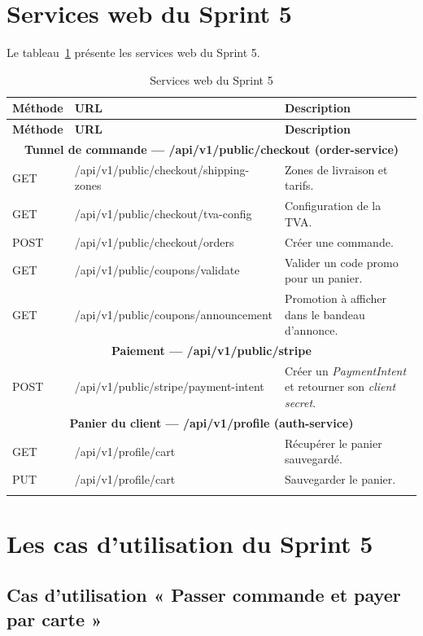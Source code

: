 \section{Services web du Sprint 5}
Le tableau~\ref{tab:ws-sprint5} présente les services web du Sprint 5.
\renewcommand{\arraystretch}{1.15}
\setlength{\tabcolsep}{4pt}
\begin{longtable}{|p{1.5cm}|p{6.8cm}|p{6.2cm}|}
\hline
\textbf{Méthode} & \textbf{URL} & \textbf{Description} \\
\hline
\endfirsthead
\hline
\textbf{Méthode} & \textbf{URL} & \textbf{Description} \\
\hline
\endhead
\multicolumn{3}{|c|}{\textbf{Tunnel de commande --- /api/v1/public/checkout (order-service)}} \\
\hline
GET & /api/v1/public/checkout/shipping-zones & Zones de livraison et tarifs. \\
\hline
GET & /api/v1/public/checkout/tva-config & Configuration de la TVA. \\
\hline
POST & /api/v1/public/checkout/orders & Créer une commande. \\
\hline
GET & /api/v1/public/coupons/validate & Valider un code promo pour un panier. \\
\hline
GET & /api/v1/public/coupons/announcement & Promotion à afficher dans le bandeau d'annonce. \\
\hline
\multicolumn{3}{|c|}{\textbf{Paiement --- /api/v1/public/stripe}} \\
\hline
POST & /api/v1/public/stripe/payment-intent & Créer un \textit{PaymentIntent} et retourner son \textit{client secret}. \\
\hline
\multicolumn{3}{|c|}{\textbf{Panier du client --- /api/v1/profile (auth-service)}} \\
\hline
GET & /api/v1/profile/cart & Récupérer le panier sauvegardé. \\
\hline
PUT & /api/v1/profile/cart & Sauvegarder le panier. \\
\hline
\caption{Services web du Sprint 5}
\label{tab:ws-sprint5}
\end{longtable}

\section{Les cas d'utilisation du Sprint 5}
\subsection{Cas d'utilisation « Passer commande et payer par carte »}

